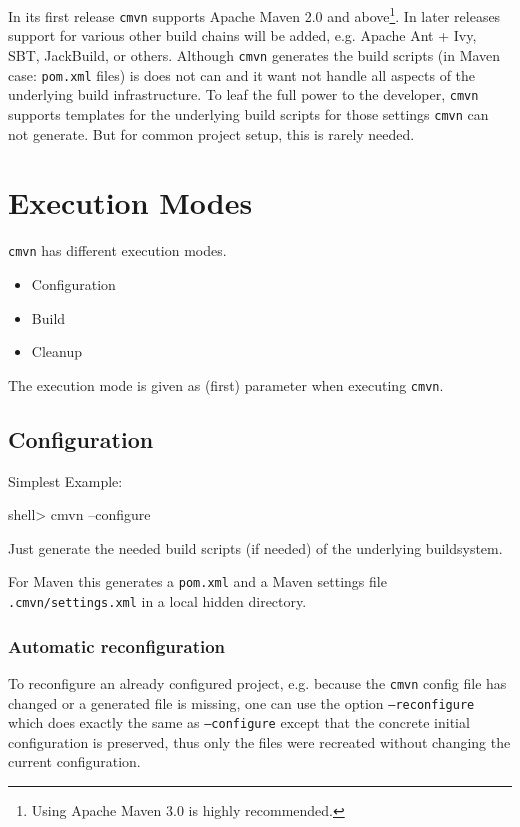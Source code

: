 \documentclass[a4paper,11pt,english,oneside,halfparskip]{scrartcl}
\newcommand{\CMVN}{\texttt{cmvn}}
\newcommand{\cmvn}{\texttt{cmvn}}
\newcommand{\code}[1]{\texttt{#1}}
\newcommand{\pom}{\code{pom.xml}}
\begin{document}
In its first release \CMVN{} supports Apache Maven 2.0 and above\footnote{Using Apache Maven 3.0 is highly recommended.}. In later releases support for various other build chains will be added, e.g. Apache Ant + Ivy, SBT, JackBuild, or others. Although \CMVN{} generates the build scripts (in Maven case: \pom{} files) is does not can and it want not handle all aspects of the underlying build infrastructure. To leaf the full power to the developer, \CMVN{} supports templates for the underlying build scripts for those settings \CMVN{} can not generate. But for common project setup, this is rarely needed.

\section{Execution Modes}

\CMVN{} has different execution modes.

\begin{itemize}
 \item Configuration
 \item Build
 \item Cleanup
\end{itemize}

The execution mode is given as (first) parameter when executing \CMVN{}.



\subsection{Configuration}

Simplest Example: 

\begin{Cmdline}
shell> cmvn --configure
\end{Cmdline}

Just generate the needed build scripts (if needed) of the underlying buildsystem.

For Maven this generates a \pom{} and a Maven settings file \code{.cmvn/settings.xml} in a local hidden directory.

\subsubsection{Automatic reconfiguration}

To reconfigure an already configured project, e.g. because the \cmvn{} config file has changed or a generated file is missing, one can use the option \code{--reconfigure} which does exactly the same as \code{--configure} except that the concrete initial configuration is preserved, thus only the files were recreated without changing the current configuration. 
\end{document}
